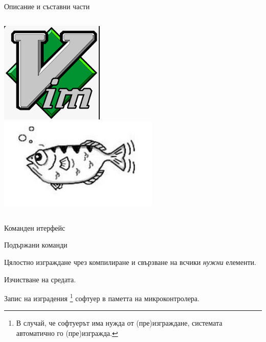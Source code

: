 \documentclass{beamer}
\begin{document}
\begin{frame}{Описание и съставни части}
\begin{columns}
			\includegraphics[width=0.95\linewidth]{Images/vim.png}\\[0.5em]
			\includegraphics[width=0.95\linewidth]{Images/gdb.png}
	\end{columns}
\end{frame}

\begin{frame}{Команден итерфейс}

	\begin{block}{Подържани команди }
	\begin{description}
		\pause
		\item[make | make all] Цялостно изграждане чрез компилиране и свързване на всчики \emph{нужни} елементи.

		\pause
		\item[make clean] Изчистване на средата.

		\pause
		\item[make flash] Запис на изградения
		\footnote{В случай, че софтуерът има нужда от (пре)изграждане, системата автоматично го (пре)изгражда.}
		софтуер в паметта на микроконтролера.

	\end{description}
	\end{block}
\end{frame}
\end{document}
